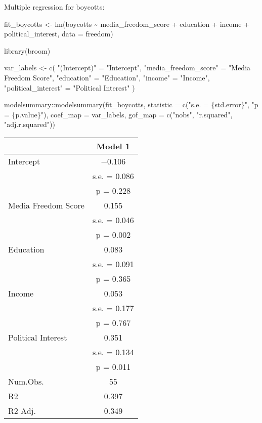 \documentclass[
]{article}
\newenvironment{Shaded}{\begin{snugshade}}{\end{snugshade}}
\newcommand{\AttributeTok}[1]{\textcolor[rgb]{0.77,0.63,0.00}{#1}}
\newcommand{\FunctionTok}[1]{\textcolor[rgb]{0.00,0.00,0.00}{#1}}
\newcommand{\NormalTok}[1]{#1}
\newcommand{\OtherTok}[1]{\textcolor[rgb]{0.56,0.35,0.01}{#1}}
\newcommand{\SpecialCharTok}[1]{\textcolor[rgb]{0.00,0.00,0.00}{#1}}
\newcommand{\StringTok}[1]{\textcolor[rgb]{0.31,0.60,0.02}{#1}}
\begin{document}
Multiple regression for boycotts:

\begin{Shaded}
\begin{Highlighting}[]
\NormalTok{fit\_boycotts }\OtherTok{\textless{}{-}} \FunctionTok{lm}\NormalTok{(boycotts }\SpecialCharTok{\textasciitilde{}}\NormalTok{ media\_freedom\_score }\SpecialCharTok{+}\NormalTok{ education }\SpecialCharTok{+}\NormalTok{ income }\SpecialCharTok{+}\NormalTok{ political\_interest, }\AttributeTok{data =}\NormalTok{ freedom)}

\FunctionTok{library}\NormalTok{(broom)}

\NormalTok{var\_labels }\OtherTok{\textless{}{-}} \FunctionTok{c}\NormalTok{(}
    \StringTok{"(Intercept)"} \OtherTok{=} \StringTok{"Intercept"}\NormalTok{,}
    \StringTok{"media\_freedom\_score"} \OtherTok{=} \StringTok{"Media Freedom Score"}\NormalTok{,}
    \StringTok{"education"} \OtherTok{=} \StringTok{"Education"}\NormalTok{,}
    \StringTok{"income"} \OtherTok{=} \StringTok{"Income"}\NormalTok{,}
    \StringTok{"political\_interest"} \OtherTok{=} \StringTok{"Political Interest"}
\NormalTok{)}

\NormalTok{modelsummary}\SpecialCharTok{::}\FunctionTok{modelsummary}\NormalTok{(fit\_boycotts,}
                             \AttributeTok{statistic =} \FunctionTok{c}\NormalTok{(}\StringTok{"s.e. = \{std.error\}"}\NormalTok{,}
               \StringTok{"p = \{p.value\}"}\NormalTok{),}
\AttributeTok{coef\_map =}\NormalTok{ var\_labels,}
\AttributeTok{gof\_map =} \FunctionTok{c}\NormalTok{(}\StringTok{"nobs"}\NormalTok{, }\StringTok{"r.squared"}\NormalTok{, }\StringTok{"adj.r.squared"}\NormalTok{))}
\end{Highlighting}
\end{Shaded}

\begin{table}
\centering
\begin{tabular}[t]{lc}
\toprule
  & Model 1\\
\midrule
Intercept & \num{-0.106}\\
 & s.e. = \num{0.086}\\
 & p = \num{0.228}\\
Media Freedom Score & \num{0.155}\\
 & s.e. = \num{0.046}\\
 & p = \num{0.002}\\
Education & \num{0.083}\\
 & s.e. = \num{0.091}\\
 & p = \num{0.365}\\
Income & \num{0.053}\\
 & s.e. = \num{0.177}\\
 & p = \num{0.767}\\
Political Interest & \num{0.351}\\
 & s.e. = \num{0.134}\\
 & p = \num{0.011}\\
\midrule
Num.Obs. & \num{55}\\
R2 & \num{0.397}\\
R2 Adj. & \num{0.349}\\
\bottomrule
\end{tabular}
\end{table}
\end{document}
